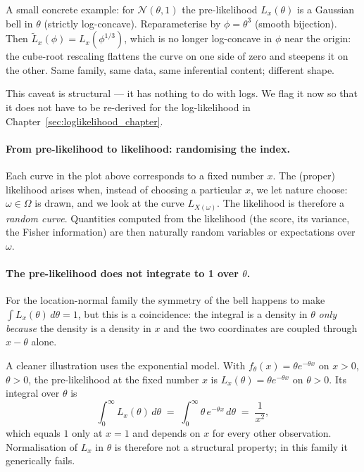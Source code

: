 \documentclass[a4paper,oneside,12pt]{extarticle}
\theoremstyle{plain}
\theoremstyle{definition}
\theoremstyle{remark}
\begin{document}
A small concrete example: for $\mathcal{N}(\theta, 1)$ the pre-likelihood
$L_x(\theta)$ is a Gaussian bell in $\theta$ (strictly log-concave).
Reparameterise by $\phi = \theta^3$ (smooth bijection).  Then
$\tilde L_x(\phi) = L_x(\phi^{1/3})$, which is no longer log-concave
in $\phi$ near the origin: the cube-root rescaling flattens the curve
on one side of zero and steepens it on the other.  Same family, same
data, same inferential content; different shape.

This caveat is structural --- it has nothing to do with logs.  We
flag it now so that it does not have to be re-derived for the
log-likelihood in Chapter~\ref{sec:loglikelihood_chapter}.

\paragraph{From pre-likelihood to likelihood: randomising the index.}
Each curve in the plot above corresponds to a fixed number $x$.
The (proper) likelihood arises when, instead of choosing a particular
$x$, we let nature choose: $\omega \in \Omega$ is drawn, and we
look at the curve $L_{X(\omega)}$.  The likelihood is therefore a
\emph{random curve}.  Quantities computed from the likelihood
(the score, its variance, the Fisher information) are then naturally
random variables or expectations over $\omega$.

\paragraph{The pre-likelihood does not integrate to 1 over $\theta$.}
For the location-normal family the symmetry of the bell happens to
make $\int L_x(\theta)\,d\theta = 1$, but this is a coincidence:
the integral is a density in $\theta$ \emph{only because} the
density is a density in $x$ and the two coordinates are coupled
through $x-\theta$ alone.

A cleaner illustration uses the exponential model.  With
$f_\theta(x) = \theta e^{-\theta x}$ on $x>0$, $\theta>0$, the
pre-likelihood at the fixed number $x$ is
$L_x(\theta) = \theta e^{-\theta x}$ on $\theta>0$.  Its integral
over $\theta$ is
\[
  \int_0^\infty L_x(\theta)\,d\theta
  \;=\; \int_0^\infty \theta\,e^{-\theta x}\,d\theta
  \;=\; \frac{1}{x^2},
\]
which equals $1$ only at $x=1$ and depends on $x$ for every other
observation.  Normalisation of $L_x$ in $\theta$ is therefore not a
structural property; in this family it generically fails.
\end{document}
